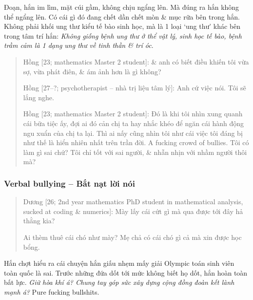 \documentclass[12pt]{article}
\begin{document}
Đoạn, hắn im lìm, mặt cúi gầm, không chịu ngẩng lên. Mà đúng ra hắn không thể ngẩng lên. Có cái gì đó đang chết dần chết mòn \& mục rữa bên trong hắn. Không phải khối ung thư kiểu tế bào sinh học, mà là 1 loại `ung thư' khác bên trong tâm trí hắn: {\it Không giống bệnh ung thư ở thể vật lý, sinh học tế bào, bệnh trầm cảm là 1 dạng ung thư về tinh thần \& trí óc}.
\begin{quote}
	{\sf Hồng [23; mathematics Master 2 student]}: \& anh có biết điều khiến tôi vừa sợ, vừa phát điên, \& ám ảnh hơn là gì không?
	
	{\sf Hồng [27--?; psychotherapist -- nhà trị liệu tâm lý]}: Anh cứ việc nói. Tôi sẽ lắng nghe.
	
	{\sf Hồng [23; mathematics Master 2 student]}: Đó là khi tôi nhìn xung quanh cái bữa tiệc ấy, đợi ai đó cản chị ta hay nhắc khéo để ngăn cái hành động ngu xuẩn của chị ta lại. Thì ai nấy cũng nhìn tôi như cái việc tôi đáng bị như thế là hiển nhiên nhất trên trần đời. A fucking crowd of bullies. Tôi có làm gì sai chứ? Tôi chỉ tốt với sai người, \& nhẫn nhịn với nhầm người thôi mà?
\end{quote}

\subsubsection{Verbal bullying -- Bắt nạt lời nói}

\begin{quote}
	{\sf Dương [26; 2nd year mathematics PhD student in mathematical analysis, sucked at coding \& numerics]}: Mày lấy cái cứt gì mà qua được tới đây hả thằng kia?
	
	Ai thèm thuê cái chó như mày? Mẹ chả có cái chó gì cả mà xin được học bổng.
\end{quote}
Hắn chợt hiểu ra cái chuyện hắn giấu nhẹm mấy giải Olympic toán sinh viên toàn quốc là sai. Trước những đứa dốt tới mức không biết họ dốt, hắn hoàn toàn bất lực. {\it Giữ hòa khí á? Chung tay góp sức xây dựng cộng đồng đoàn kết lành mạnh á?} Pure fucking bullshits.
\end{document}
